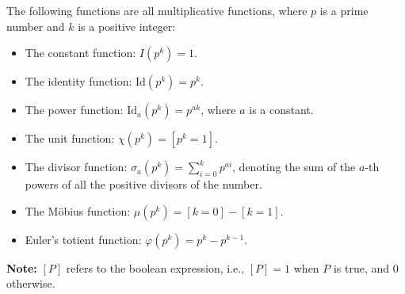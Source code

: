 The following functions are all multiplicative functions, where \( p \) is a prime number and \( k \) is a positive integer:

\begin{itemize}
    \item The constant function: \( I(p^k) = 1 \).
    \item The identity function: \( \text{Id}(p^k) = p^k \).
    \item The power function: \( \text{Id}_a(p^k) = p^{ak} \), where \( a \) is a constant.
    \item The unit function: \( \chi(p^k) = [ p^k = 1 ] \).
    \item The divisor function: \( \sigma_a(p^k) = \sum_{i=0}^k p^{ai} \), denoting the sum of the \( a \)-th powers of all the positive divisors of the number.
    \item The Möbius function: \( \mu(p^k) = [ k = 0 ] - [ k = 1 ] \).
    \item Euler's totient function: \( \varphi(p^k) = p^k - p^{k-1} \).
\end{itemize}

\textbf{Note:} \([P]\) refers to the boolean expression, i.e., \([P] = 1\) when \( P \) is true, and \( 0 \) otherwise.
